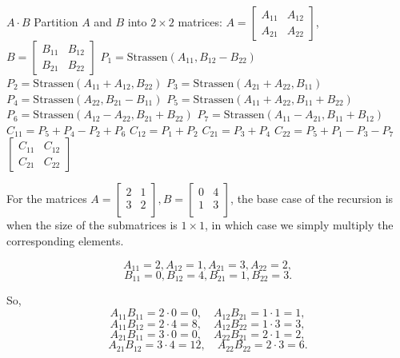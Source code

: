 \documentclass[12pt]{article}
\begin{document}
\begin{center}
\begin{algorithmic}[1]
    \State \Return $A \cdot B$
    \EndIf
    \State Partition $A$ and $B$ into $2 \times 2$ matrices:
    \State $A = \begin{bmatrix} A_{11} & A_{12} \\ A_{21} & A_{22} \end{bmatrix}$, $B = \begin{bmatrix} B_{11} & B_{12} \\ B_{21} & B_{22} \end{bmatrix}$
    \State $P_1 = \mathrm{Strassen}(A_{11}, B_{12} - B_{22})$ 
    \State $P_2 = \mathrm{Strassen}(A_{11} + A_{12}, B_{22})$
    \State $P_3 = \mathrm{Strassen}(A_{21} + A_{22}, B_{11})$
    \State $P_4 = \mathrm{Strassen}(A_{22}, B_{21} - B_{11})$
    \State $P_5 = \mathrm{Strassen}(A_{11} + A_{22}, B_{11} + B_{22})$
    \State $P_6 = \mathrm{Strassen}(A_{12} - A_{22}, B_{21} + B_{22})$
    \State $P_7 = \mathrm{Strassen}(A_{11} - A_{21}, B_{11} + B_{12})$
    \State $C_{11} = P_5 + P_4 - P_2 + P_6$ 
    \State $C_{12} = P_1 + P_2$
    \State $C_{21} = P_3 + P_4$
    \State $C_{22} = P_5 + P_1 - P_3 - P_7$
    \State \Return $\begin{bmatrix} C_{11} & C_{12} \\ C_{21} & C_{22} \end{bmatrix}$
    \EndProcedure
    \EndProcedure
\end{algorithmic}
\end{center}

For the matrices
$A = \begin{bmatrix}
2 & 1 \\
3 & 2 \\
\end{bmatrix}, B = \begin{bmatrix}
0 & 4 \\
1 & 3 \\
\end{bmatrix}$, the base case of the recursion is when the size of the submatrices is $1 \times 1$, in which case we simply multiply the corresponding elements. 

$$A_{11}=2,A_{12}=1,A_{21}=3,A_{22}=2,$$
$$B_{11}=0,B_{12}=4,B_{21}=1,B_{22}=3.$$

So, 
$$A_{11}B_{11} = 2 \cdot 0 = 0, \quad A_{12}B_{21} = 1 \cdot 1 = 1, $$
$$A_{11}B_{12} = 2 \cdot 4 = 8, \quad A_{12}B_{22} = 1 \cdot 3 = 3, $$
$$A_{21}B_{11} = 3 \cdot 0 = 0, \quad A_{22}B_{21} = 2 \cdot 1 = 2, $$
$$A_{21}B_{12} = 3 \cdot 4 = 12, \quad A_{22}B_{22} = 2 \cdot 3 = 6.$$
\end{document}
